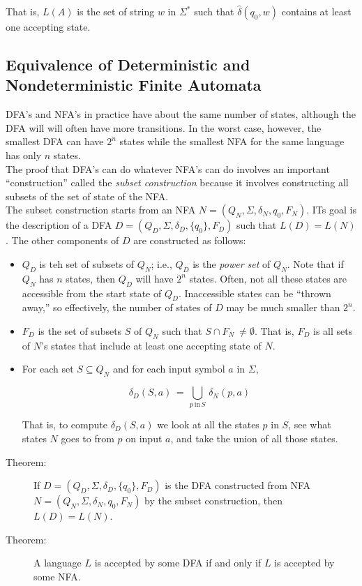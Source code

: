 \documentclass[]{article}
\begin{document}
    That is, $L(A)$ is the set of string $w$ in $\Sigma^*$ such that $
    \hat{\delta}(q_0, w)$ contains at least one accepting state.

  \subsection*{Equivalence of Deterministic and Nondeterministic Finite
  Automata}
    DFA's and NFA's in practice have about the same number of states, although
    the DFA will will often have more transitions. In the worst case, however,
    the smallest DFA can have $2^n$ states while the smallest NFA for the same
    language has only $n$ states. \\
    \indent The proof that DFA's can do whatever NFA's can do involves an
    important ``construction'' called the \emph{subset construction} because
    it involves constructing all subsets of the set of state of the NFA. \\
    \indent The subset construction starts from an NFA $N = (Q_N, \Sigma,
    \delta_N, q_0, F_N)$. ITs goal is the description of a DFA $D = (Q_D,
    \Sigma, \delta_D, \{q_0\}, F_D)$ such that $L(D) = L(N)$. The other
    components of $D$ are constructed as follows:
      \begin{itemize}
        \item $Q_D$ is teh set of subsets of $Q_N$; i.e., $Q_D$ is the
        \emph{power set} of $Q_N$. Note that if $Q_N$ has $n$ states, then
        $Q_D$ will have $2^n$ states. Often, not all these states are
        accessible from the start state of $Q_D$. Inaccessible states can be
        ``thrown away,'' so effectively, the number of states of $D$ may be
        much smaller than $2^n$.
        \item $F_D$ is the set of subsets $S$ of $Q_N$ such that $S \cap F_N \
        \neq \emptyset$. That is, $F_D$ is all sets of $N$'s states that
        include at least one accepting state of $N$.
        \item For each set $S \subseteq Q_N$ and for each input symbol $a$ in
        $\Sigma$,

          \[
            \delta_D(S, a) \, = \, \bigcup_{p \, \text{in} \, S} \,
            \delta_N(p,a)
          \]

        That is, to compute $\delta_D(S,a)$ we look at all the states $p$ in
        $S$, see what states $N$ goes to from $p$ on input $a$, and take the
        union of all those states.
      \end{itemize}
      \begin{description}
        \item[Theorem:] If $D = (Q_D, \Sigma, \delta_D, \{q_0\}, F_D)$ is the
        DFA constructed from NFA $N = (Q_N, \Sigma, \delta_N, q_0, F_N)$ by
        the subset construction, then $L(D) = L(N)$.
        \item[Theorem:] A language $L$ is accepted by some DFA if and only if
        $L$ is accepted by some NFA.
      \end{description}
\end{document}
